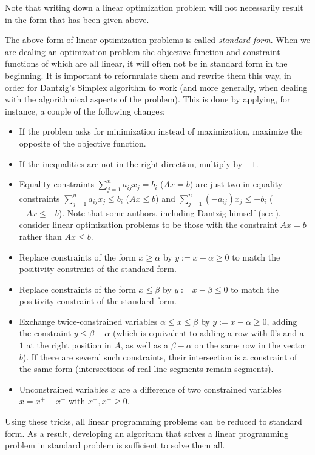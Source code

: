 \begin{remark}
    Note that writing down a linear optimization problem will not necessarily result in the form that has been given above.

    The above form of linear optimization problems is called \textit{standard form}. When we are dealing an optimization problem the objective function and constraint functions of which are all linear, it will often not be in standard form in the beginning. It is important to reformulate them and rewrite them this way, in order for Dantzig's Simplex algorithm to work (and more generally, when  dealing with the algorithmical aspects of the problem). This is done by applying, for instance, a couple of the following changes:

    \begin{itemize}
        \item If the problem asks for minimization instead of maximization, maximize the opposite of the objective function.
        
        \item If the inequalities are not in the right direction, multiply by $ -1 $. 

        \item Equality constraints $ \sum_{j=1}^n a_{ij}x_j = b_i $ ($ Ax = b $) are just two in equality constraints $ \sum_{j=1}^n a_{ij}x_j \leqslant b_i $ ($ Ax \leqslant b $) and $ \sum_{j=1}^n (-a_{ij})x_j \leqslant -b_i $ ($ -Ax \leqslant -b $). Note that some authors, including Dantzig himself (see \cite{dantzig1997} \cite{dantzig2002}), consider linear optimization problems to be those with the constraint $ Ax = b $ rather than $ Ax \leqslant b $.

        \item Replace constraints of the form $ x \geqslant \alpha $ by $ y := x - \alpha \geqslant 0$ to match the positivity constraint of the standard form.

        \item Replace constraints of the form $ x \leqslant \beta $ by $ y := x - \beta \leqslant 0$ to match the positivity constraint of the standard form.

        \item Exchange twice-constrained variables $ \alpha \leqslant x \leqslant \beta $ by $ y := x - \alpha \geqslant 0 $, adding the constraint $ y \leqslant \beta - \alpha $ (which is equivalent to adding a row with $ 0 $'s and a $ 1 $ at the right position in $ A $, as well as a $ \beta - \alpha $ on the same row in the vector $ b $). If there are several such constraints, their intersection is a constraint of the same form (intersections of real-line segments remain segments).

        \item Unconstrained variables $ x $ are a difference of two constrained variables $ x = x^+ - x^- $ with $ x^+, x^- \geqslant 0 $.
    \end{itemize}

    Using these tricks, all linear programming problems can be reduced to standard form. As a result, developing an algorithm that solves a linear programming problem in standard problem is sufficient to solve them all.
\end{remark}
